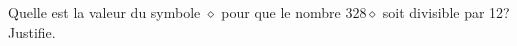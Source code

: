 %
%
Quelle est la valeur du symbole $\diamond$  pour que le nombre $328\diamond$  soit divisible par 12? Justifie.\\
